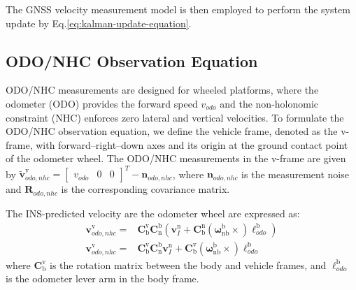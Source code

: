 \documentclass{article}
\begin{document}
The GNSS velocity measurement model is then employed to perform the system update by Eq.\eqref{eq:kalman-update-equation}.


\subsection{ODO/NHC Observation Equation}
ODO/NHC measurements are designed for wheeled platforms, where the odometer (ODO) provides the forward speed $v_{odo}$ and the non-holonomic constraint (NHC) enforces zero lateral and vertical velocities. To formulate the ODO/NHC observation equation, we define the vehicle frame, denoted as the $\mathrm{v}$-frame, with forward–right–down axes and its origin at the ground contact point of the odometer wheel. The ODO/NHC measurements in the $\mathrm{v}$-frame are given by $\tilde{\boldsymbol{v}}_{odo,nhc}^{\mathrm{v}} = \begin{bmatrix} v_{odo} & 0 & 0 \end{bmatrix}^T - \boldsymbol{n}_{odo,nhc}$, where $\boldsymbol{n}_{odo,nhc}$ is the measurement noise and $\boldsymbol{R}_{odo,nhc}$ is the corresponding covariance matrix.

The INS-predicted velocity are the odometer wheel are expressed as:
\begin{equation}
    \label{eq:odo-nhc-velocity-predicted-by-ins-velocity}
    \begin{aligned}
        \boldsymbol{v}_{odo,nhc}^{\mathrm{v}} =& \mathbf{C}_{\mathrm{b}}^{\mathrm{v}} \mathbf{C}_{\mathrm{n}}^{\mathrm{b}} \left( \boldsymbol{v}_{I}^{\mathrm{n}} + \mathbf{C}_{\mathrm{b}}^{\mathrm{n}} \left(\boldsymbol{\omega}_{\mathrm{n} \mathrm{b}}^{\mathrm{b}} \times \right) \boldsymbol{\ell}_{odo}^{\mathrm{b}} \right) \\
        \boldsymbol{v}_{odo,nhc}^{\mathrm{v}} =& \mathbf{C}_{\mathrm{b}}^{\mathrm{v}} \mathbf{C}_{\mathrm{n}}^{\mathrm{b}} \boldsymbol{v}_{I}^{\mathrm{n}} + \mathbf{C}_{\mathrm{b}}^{\mathrm{v}} \left(\boldsymbol{\omega}_{\mathrm{n} \mathrm{b}}^{\mathrm{b}} \times \right) \boldsymbol{\ell}_{odo}^{\mathrm{b}}
    \end{aligned}
\end{equation}
where $\mathbf{C}_{\mathrm{b}}^{\mathrm{v}}$ is the rotation matrix between the body and vehicle frames, and $\boldsymbol{\ell}_{odo}^{\mathrm{b}}$ is the odometer lever arm in the body frame.
\end{document}
